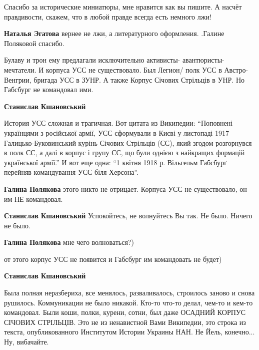 \begin{itemize}
\begin{itemize}
\begin{itemize}
\end{itemize} %


Спасибо за исторические миниатюры, мне нравится как вы пишите. А насчёт
правдивости, скажем, что в любой правде всегда есть немного лжи!

\begin{itemize} %
\textbf{Наталья Эгатова} вернее не лжи, а литературного оформления. .Галине Поляковой спасибо.
\end{itemize} %

\end{itemize} %


Булаву и трон ему предлагали исключительно активисты- авантюристы- мечтатели.
И корпуса УСС не существовало. Был Легион/ полк УСС в Австро- Венгрии, бригада
УСС в ЗУНР. А также Корпус Січових Стрільців в УНР. Но Габсбург не командовал
ими.

\begin{itemize} %
\textbf{Станислав Кшановський} 

История УСС сложная и трагичная. Вот цитата из Википедии: \enquote{Поповнені українцями
з російської армії, УСС сформували в Києві у листопаді 1917
Галицько-Буковинський курінь Січових Стрільців (СС), який згодом розгорнувся в
полк СС, а далі в корпус і групу СС, що були однією з найкращих формацій
української армії.} И вот еще одна: \enquote{1 квітня 1918 р. Вільгельм Габсбурґ
перейняв командування УСС біля Херсона}.

\begin{itemize} %
\textbf{Галина Полякова} этого никто не отрицает. Корпуса УСС не существовало, он им НЕ командовал.

\textbf{Станислав Кшановський} Успокойтесь, не волнуйтесь Вы так. Не было. Ничего не было.

\textbf{Галина Полякова} мне чего волноваться?)

от этого корпус УСС не появится и Габсбург им командовать не будет)

\textbf{Станислав Кшановський} 

Была полная неразбериха, все менялось, разваливалось, строилось заново и снова
рушилось. Коммуникации не было никакой. Кто-то что-то делал, чем-то и кем-то
командовал. Были коши, полки, курени, сотни, был даже ОСАДНИЙ КОРПУС СІЧОВИХ
СТРІЛЬЦІВ. Это не из ненавистной Вами Википедии, это строка из текста,
опубликованного Институтом Истории Украины НАН. Не Йель, конечно... Ну,
вибачайте.



\end{itemize}
\end{itemize}
\end{itemize}
